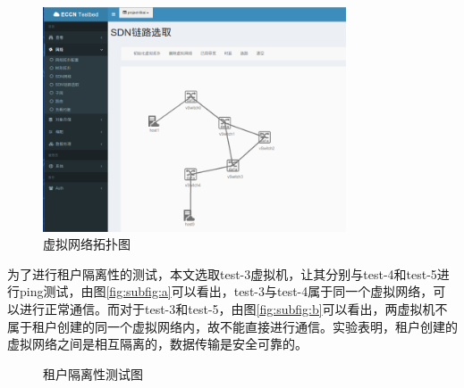\begin{figure}[!htb]
  \centering
  \includegraphics[width=0.8\textwidth,height=0.50\textwidth]{logo/virtualnet.png}
  \caption{虚拟网络拓扑图}
  \label{fig:virtualnet-test}
\end{figure}

为了进行租户隔离性的测试，本文选取test-3虚拟机，让其分别与test-4和test-5进行ping测试，由图\ref{fig:subfig:a}可以看出，test-3与test-4属于同一个虚拟网络，可以进行正常通信。而对于test-3和test-5，由图\ref{fig:subfig:b}可以看出，两虚拟机不属于租户创建的同一个虚拟网络内，故不能直接进行通信。实验表明，租户创建的虚拟网络之间是相互隔离的，数据传输是安全可靠的。

\begin{figure}[!htb]
 \centering
 \caption{租户隔离性测试图}
 \label{fig:isolation} %
\end{figure}
